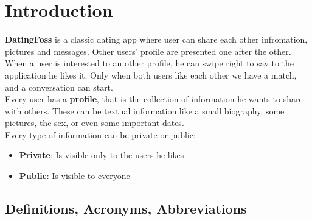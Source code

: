 \documentclass{article}
\begin{document}
\section{Introduction}
\textbf{DatingFoss} is a classic dating app where user can share each other infromation, pictures and messages. Other users' profile are presented one after the other. When a user is interested to an other profile, he can swipe right to say to the application he likes it. Only when both users like each other we have a match, and a conversation can start.
\\
Every user has a \textbf{profile}, that is the collection of information he wants to share with others. These can be textual information like a small biography, some pictures, the sex, or even some important dates. \\ Every type of information can be private or public: 
\begin{itemize}
    \item \textbf{Private}: Is visible only to the users he likes
    \item \textbf{Public}: Is visible to everyone
\end{itemize}
\subsection{Definitions, Acronyms, Abbreviations}
\end{document}
